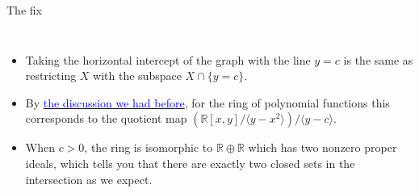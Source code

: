 \documentclass[aspectratio=169,10pt]{beamer}
\begin{document}
\begin{frame}{The fix}
\begin{columns}[T]
    \begin{itemize}
        \item Taking the horizontal intercept of the graph with the line $y=c$ is the same as restricting $X$ with the subspace $X \cap \{y=c\}$.
        \pause\item By \hyperlink{Quotients}{\textcolor{blue}{the discussion we had before}}, for the ring of polynomial functions this corresponds to the quotient map $(\mathbb{R}[x,y]/\langle y-x^2\rangle)/\langle y-c\rangle$.
        \pause\item When $c>0$, the ring is isomorphic to $\mathbb{R} \oplus \mathbb{R}$ which has two nonzero proper ideals, which tells you that there are exactly two closed sets in the intersection as we expect.
    \end{itemize}

    \centering
\end{columns}
\end{frame}
\end{document}

